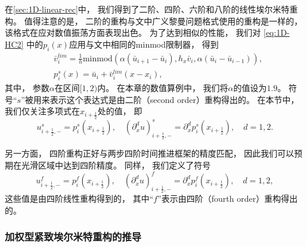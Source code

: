 在\cref{sec:1D-linear-rec}中，
我们得到了二阶、四阶、六阶和八阶的线性埃尔米特重构。
值得注意的是，
二阶的重构与文\cite{Book-Matania}中广义黎曼问题格式使用的重构是一样的，
该格式在应对数值振荡方面表现出色。
为了达到相似的性能，
我们对 \cref{eq:1D-HC2} 中的$p_{i}(x)$应用与文\cite{Book-Matania}中相同的minmod限制器，
得到
\begin{align}
  \label{eq:1D-minmod-limiter}
   & \bar v^{lim}_{i} = \frac{1}{h}\mbox{minmod}(\alpha(\bar u_{i+1}-\bar u_{i}), h_x\bar v_{i}, \alpha(\bar u_{i}-\bar u_{i-1})), \\
   & p^{{s}}_{i}(x) = \bar u_{i}+ \bar v^{lim}_{i}(x-x_{i}),
\end{align}
其中，
参数$\alpha$在区间$[1,2)$内。
在本章的数值算例中，
我们将$\alpha$的值设为$1.9$。
符号“${{s}}$”被用来表示这个表达式是由二阶（second order）重构得出的。
在本节中，
我们仅关注多项式在$x_{i+\frac{1}{2}}$处的值，
即
\begin{equation}
  u_{i+\frac{1}{2},-}^{{s}}= p^{{s}}_{i}(x_{i+\frac{1}{2}}), \quad
  \left({\partial_{x}^{d}}u\right)_{i+\frac{1}{2},-}^{{s}}= {\partial_{x}^{d}}p_{i}^{{s}}(x_{i+\frac{1}{2}}), \quad d=1,2.
\end{equation}

另一方面，
四阶重构正好与两步四阶时间推进框架的精度匹配，
因此我们可以预期在光滑区域中达到四阶精度。
同样，
我们定义了符号
\begin{equation}
  u_{i+\frac{1}{2},-}^{{f}}= p^{{f}}_{i}(x_{i+\frac{1}{2}}), \quad
  \left({\partial_{x}^{d}}u\right)_{i+\frac{1}{2},-}^{{f}}= {\partial_{x}^{d}}p_{i}^{{f}}(x_{i+\frac{1}{2}}), \quad d=1,2,
\end{equation}
这些值是由四阶线性重构得到的，
其中“${{f}}$”表示由四阶（fourth order）重构得出的。

\subsubsection{加权型紧致埃尔米特重构的推导}

